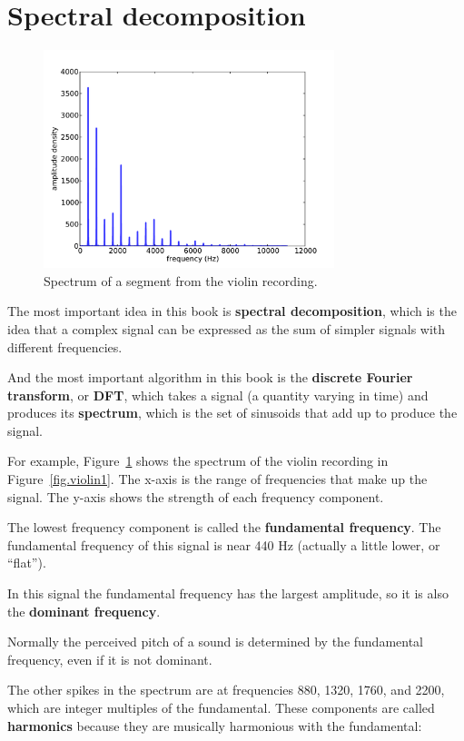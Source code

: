 \documentclass[12pt]{book}
\begin{document}
\section{Spectral decomposition}

\begin{figure}
\centerline{\includegraphics[height=2.5in]{figs/violin2.pdf}}
\caption{Spectrum of a segment from the violin recording.}
\label{fig.violin2}
\end{figure}

The most important idea in this book is {\bf spectral decomposition},
which is the idea that a complex signal can be expressed as the sum of
simpler signals with different frequencies.

And the most important algorithm in this book is the {\bf discrete
  Fourier transform}, or {\bf DFT}, which takes a signal (a quantity
varying in time) and produces its {\bf spectrum}, which is the set of
sinusoids that add up to produce the signal.

For example, Figure~\ref{fig.violin2} shows the spectrum of the violin
recording in Figure~\ref{fig.violin1}.  The x-axis is the range of
frequencies that make up the signal.  The y-axis shows the strength of
each frequency component.

The lowest frequency component is called the {\bf fundamental
  frequency}.  The fundamental frequency of this signal is near 440 Hz
(actually a little lower, or ``flat'').

In this signal the fundamental frequency has the largest amplitude,
so it is also the {\bf dominant frequency}.

Normally the perceived pitch of a sound is determined by the
fundamental frequency, even if it is not dominant. 

The other spikes in the spectrum are at frequencies 880, 1320, 1760, and
2200, which are integer multiples of the fundamental.
These components are called {\bf harmonics} because they are
musically harmonious with the fundamental:
\end{document}
